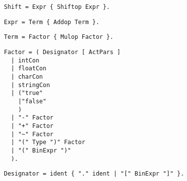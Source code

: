 \begin{samepage}
\begin{lstlisting}[language=EBNF]
Shift = Expr { Shiftop Expr }.
\end{lstlisting}
\end{samepage}


\begin{samepage}
\begin{lstlisting}[language=EBNF]
Expr = Term { Addop Term }.
\end{lstlisting}
\end{samepage}


\begin{samepage}
\begin{lstlisting}[language=EBNF]
Term = Factor { Mulop Factor }.
\end{lstlisting}
\end{samepage}


\begin{samepage}
\begin{lstlisting}[language=EBNF]
Factor = ( Designator [ ActPars ]
  | intCon
  | floatCon
  | charCon
  | stringCon
  | ("true"
    |"false"
    )
  | "-" Factor
  | "+" Factor
  | "~" Factor
  | "(" Type ")" Factor
  | "(" BinExpr ")"
  ).
\end{lstlisting}
\end{samepage}


\begin{samepage}
\begin{lstlisting}[language=EBNF]
Designator = ident { "." ident | "[" BinExpr "]" }.
\end{lstlisting}
\end{samepage}


